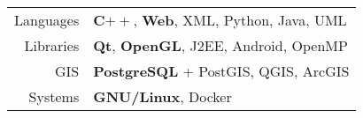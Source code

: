 
\begin{tabu} to 
  Languages & \textbf{C$++$}, \textbf{Web}, XML, Python, Java, UML\\
  Libraries & \textbf{Qt}, \textbf{OpenGL}, J2EE, Android, OpenMP\\
  GIS & \textbf{PostgreSQL} + PostGIS, QGIS, ArcGIS\\
  Systems & \textbf{GNU/Linux}, Docker
\end{tabu}

